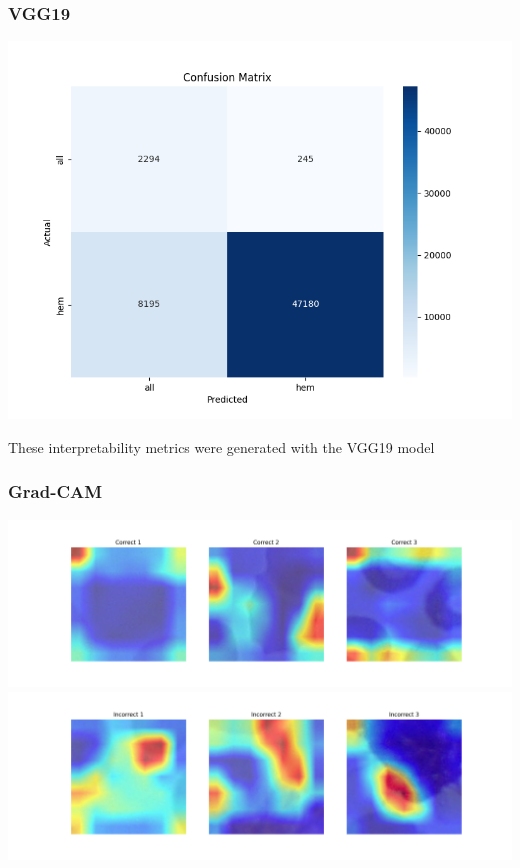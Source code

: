\documentclass[
	a4paper,
	10pt,
	unnumberedsections,
	twoside,
]{research_article}
\begin{document}
\subsubsection{VGG19}
\begin{center}
	\includegraphics[width=0.8\linewidth]{images/vgg19_confusion_matrix.png}
\end{center}


\newpage
These interpretability metrics were generated with the VGG19 model

\subsubsection{Grad-CAM}

\begin{center}
	\includegraphics[width=\linewidth]{images/dataset2_gradcam_correct.png}
	\includegraphics[width=\linewidth]{images/dataset2_gradcam_incorrect.png}
\end{center}
\end{document}
